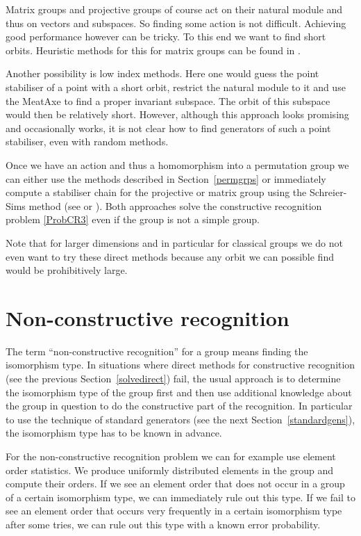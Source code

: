 Matrix groups and projective groups of course act on their natural
module and thus on vectors and subspaces. So finding some
action is not difficult. Achieving good performance however can be
tricky. To this end we want to find short orbits. Heuristic methods
for this for matrix groups can be found in \cite{shortorbits}.

Another possibility is low index methods.
Here one would guess the point stabiliser of a point with a short
orbit, restrict the natural module to it and use the MeatAxe to find a
proper invariant subspace. The orbit of this subspace would then be
relatively short. However, although this approach looks promising and
occasionally works, it is not clear how to find generators of such a
point stabiliser, even with random methods.

Once we have an action and thus a homomorphism into a permutation 
group we can either use the methods described in Section~\ref{permgrps}
or immediately compute a stabiliser chain for the projective or matrix
group using the Schreier-Sims method (see \cite{nearlylin} or
\cite{Ser}). Both approaches solve the constructive recognition
problem \ref{ProbCR3} even if the group is not a simple group.

Note that for larger dimensions and in particular for classical groups
we do not even want to try these direct methods because any orbit we
can possible find would be prohibitively large.


\section{Non-constructive recognition}
\label{nonconstructive}
%

The term ``non-constructive recognition'' for a group means finding
the isomorphism type. In situations where direct methods for constructive 
recognition (see the previous Section~\ref{solvedirect}) fail, the usual
approach is to determine the isomorphism type of the group first and
then use additional knowledge about the group in question to do the
constructive part of the recognition. In particular to use the
technique of standard generators (see the next
Section~\ref{standardgens}), the isomorphism type has to be known in
advance.

For the non-constructive recognition problem we can for example use
element order statistics. We produce uniformly distributed elements in
the group and compute their orders. If we see an element order that
does not occur in a group of a certain isomorphism type, we can
immediately rule out this type. If we fail to see an element order that
occurs very frequently in a certain isomorphism type after some tries,
we can rule out this type with a known error probability.

